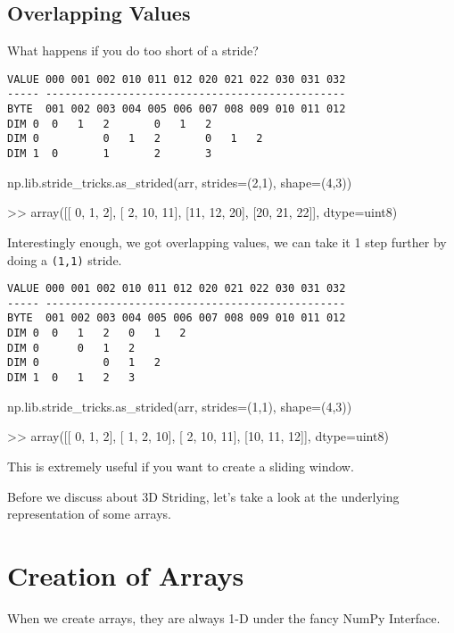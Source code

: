 \documentclass[oneside, 12pt]{report}
\begin{document}
\subsection{Overlapping Values}

What happens if you do too short of a stride?

\begin{verbatim}
VALUE 000 001 002 010 011 012 020 021 022 030 031 032
----- -----------------------------------------------
BYTE  001 002 003 004 005 006 007 008 009 010 011 012
DIM 0  0   1   2       0   1   2  
DIM 0          0   1   2       0   1   2 
DIM 1  0       1       2       3 
\end{verbatim}

\begin{python}
np.lib.stride_tricks.as_strided(arr, strides=(2,1), shape=(4,3))

>> array([[ 0,  1,  2],
          [ 2, 10, 11],
          [11, 12, 20],
          [20, 21, 22]], dtype=uint8)
\end{python}

Interestingly enough, we got overlapping values, we can take it 1 step further by doing a \verb+(1,1)+ stride.

\begin{verbatim}
VALUE 000 001 002 010 011 012 020 021 022 030 031 032
----- -----------------------------------------------
BYTE  001 002 003 004 005 006 007 008 009 010 011 012
DIM 0  0   1   2   0   1   2    
DIM 0      0   1   2 
DIM 0          0   1   2 
DIM 1  0   1   2   3 
\end{verbatim}

\begin{python}
np.lib.stride_tricks.as_strided(arr, strides=(1,1), shape=(4,3))

>> array([[ 0,  1,  2],
          [ 1,  2, 10],
          [ 2, 10, 11],
          [10, 11, 12]], dtype=uint8)
\end{python}

This is extremely useful if you want to create a sliding window.

Before we discuss about 3D Striding, let's take a look at the underlying representation of some arrays.

\section{Creation of Arrays}

When we create arrays, they are always 1-D under the fancy NumPy Interface.
\end{document}
